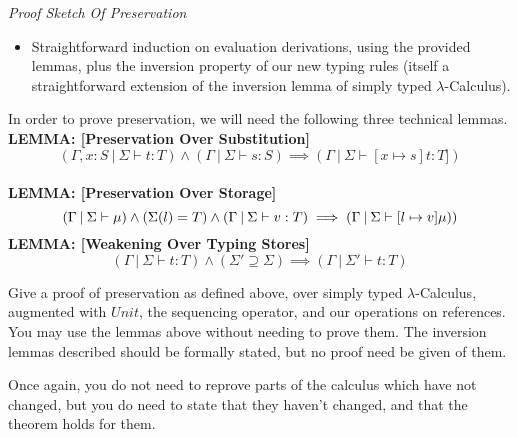 \documentclass{exam}
\begin{document}
\begin{questions}
\emph{Proof Sketch Of Preservation}
\begin{itemize}
\item Straightforward induction on evaluation derivations, using the provided lemmas, plus the inversion property of our new typing rules (itself a straightforward extension of the inversion lemma of simply typed $\lambda$-Calculus).
\end{itemize}

In order to prove preservation, we will need the following three technical lemmas. \\ 
\vspace{1em}
\textbf{LEMMA: [Preservation Over Substitution]} 
\begin{equation}
(\Gamma, x:S\:|\:\Sigma \vdash t : T) \land (\Gamma \:|\:\Sigma \vdash s: S) \implies (\Gamma \:|\:\Sigma \vdash [x \mapsto s]t : T])
\end{equation} \\
\textbf{LEMMA: [Preservation Over Storage]}
\begin{equation}
(\Gamma \:|\:\Sigma \vdash \mu) \land (\Sigma(\mathnormal{l}) = T) \land (\Gamma \:|\:\Sigma \vdash v : T) \implies (\Gamma \:|\:\Sigma \vdash [\mathnormal{l} \mapsto v]\mu))
\end{equation}
\textbf{LEMMA: [Weakening Over Typing Stores]}
\begin{equation}
(\Gamma\:|\:\Sigma \vdash t : T) \land (\Sigma' \supseteq \Sigma) \implies (\Gamma \:|\:\Sigma' \vdash t : T)
\end{equation}

Give a proof of preservation as defined above, over simply typed $\lambda$-Calculus, augmented with $Unit$, the sequencing operator, and our operations on references.  You may use the lemmas above without needing to prove them.  The inversion lemmas described should be formally stated, but no proof need be given of them.

Once again, you do not need to reprove parts of the calculus which have not changed, but you do need to state that they haven't changed, and that the theorem holds for them.  

\end{questions}
\end{document}
